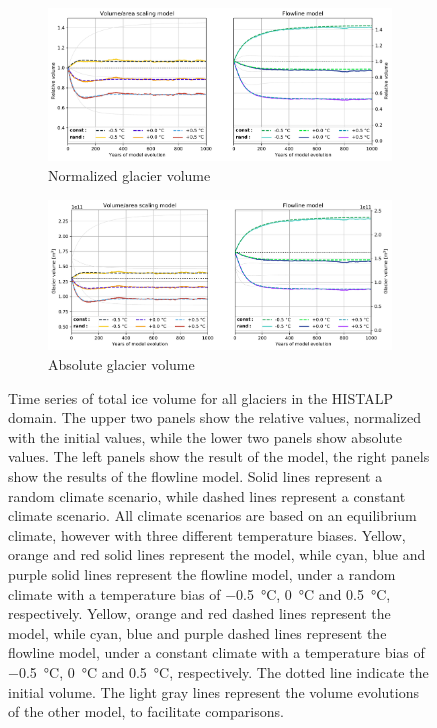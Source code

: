 
\begin{figure}[htp]
  \centering
  \begin{subfigure}[b]{0.99\textwidth}
    \caption{Normalized glacier volume}
    \label{fig:histalp_commitment:volume_norm}
    \centering
    \includegraphics[width=\textwidth]{../plots/final_plots/time_series/histalp_commitment/volume_norm.pdf}
  \end{subfigure}
  \begin{subfigure}[b]{0.99\textwidth}
    \caption{Absolute glacier volume}
    \label{fig:histalp_commitment:volume_abs}
    \centering
    \includegraphics[width=\textwidth]{../plots/final_plots/time_series/histalp_commitment/volume_abs.pdf}
  \end{subfigure}
  
  \caption{Time series of total ice volume for all glaciers in the HISTALP domain. The upper two panels show the relative values, normalized with the initial values, while the lower two panels show absolute values. The left panels show the result of the \vas{} model, the right panels show the results of the flowline model. Solid lines represent a random climate scenario, while dashed lines represent a constant climate scenario. All climate scenarios are based on an equilibrium climate, however with three different temperature biases.
  Yellow, orange and red solid lines represent the \vas{} model, while cyan, blue and purple solid lines represent the flowline model, under a random climate with a temperature bias of \SI{-.5}{\celsius}, \SI{0}{\celsius} and \SI{+.5}{\celsius}, respectively. Yellow, orange and red dashed lines represent the \vas{} model, while cyan, blue and purple dashed lines represent the flowline model, under a constant climate with a temperature bias of \SI{-.5}{\celsius}, \SI{0}{\celsius} and \SI{+.5}{\celsius}, respectively. %
  The dotted line indicate the initial volume. The light gray lines represent the volume evolutions of the other model, to facilitate comparisons.}
  \label{fig:histalp_commitment}
\end{figure}